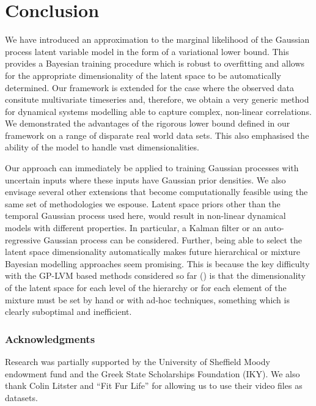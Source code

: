 \documentclass [10pt , a4paper]{article}
\begin{document}
\section{\label{section:conclusion} Conclusion}

We have introduced an approximation to the marginal likelihood of the Gaussian process latent variable model
in the form of a variational lower bound. This provides a Bayesian training procedure which is robust
to overfitting and allows for the appropriate dimensionality of the latent space to be automatically determined.
Our framework is extended for the case where the observed data consitute multivariate timeseries and,
therefore, we obtain a very generic method for dynamical systems modelling able to capture complex, non-linear
correlations. We demonstrated the advantages of the rigorous lower bound defined in our framework on a range of
disparate real world data sets. This also emphasised the ability of the model to handle vast dimensionalities.

\par Our approach can immediately be applied to training Gaussian processes with uncertain inputs where these
inputs have Gaussian prior densities. We also envisage several other extensions that become computationally
feasible using the same set of methodologies we espouse. Latent space priors other than the
temporal Gaussian process used here, would result in non-linear dynamical models with different properties. In
particular, a Kalman filter or an auto-regressive Gaussian process \cite{GPDM} can be considered.
Further, being able to select the latent space dimensionality automatically makes future hierarchical
or mixture Bayesian modelling approaches seem promising. This is because the key difficulty with the
GP-LVM based methods
considered so far (\eg \cite{hgplvm, Salzmann:2010vh}) is that the dimensionality of the latent
space for each level of the hierarchy or for
each element of the mixture must be set by hand or with ad-hoc techniques, something which is clearly
suboptimal and inefficient.



\subsubsection*{Acknowledgments}
Research was partially supported by the University of Sheffield Moody endowment fund and the Greek State
 Scholarships Foundation (IKY).
We also thank Colin Litster and ``Fit Fur Life'' for allowing us to use their video files as datasets.

%

\renewcommand*{\refname}{\begin{normalsize}References\end{normalsize}}

%








\end{document}
